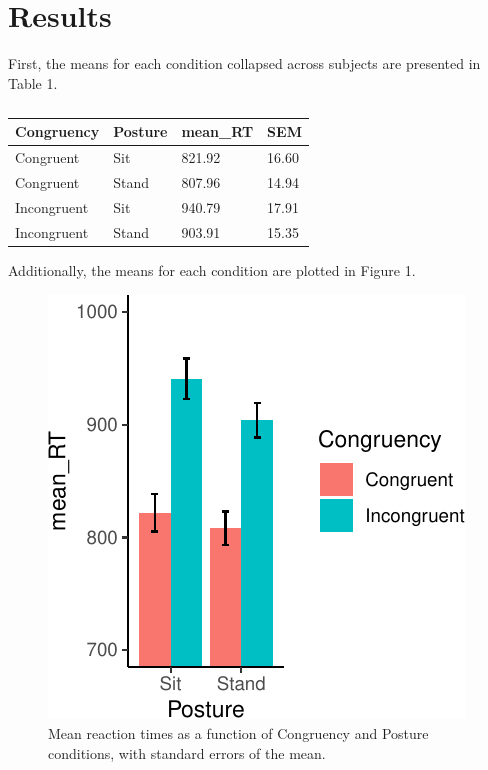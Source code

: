 \documentclass[
  man]{apa6}
\begin{document}
\hypertarget{results}{%
\section{Results}\label{results}}

First, the means for each condition collapsed across subjects are presented in Table 1.

\begin{table}[tbp]

\begin{center}
\begin{threeparttable}

\caption{\label{tab:unnamed-chunk-1}}

\begin{tabular}{llll}
\toprule
Congruency & \multicolumn{1}{c}{Posture} & \multicolumn{1}{c}{mean\_RT} & \multicolumn{1}{c}{SEM}\\
\midrule
Congruent & Sit & 821.92 & 16.60\\
Congruent & Stand & 807.96 & 14.94\\
Incongruent & Sit & 940.79 & 17.91\\
Incongruent & Stand & 903.91 & 15.35\\
\bottomrule
\end{tabular}

\end{threeparttable}
\end{center}

\end{table}

Additionally, the means for each condition are plotted in Figure 1.

\begin{figure}
\centering
\includegraphics{SemesterProject_files/figure-latex/unnamed-chunk-2-1.pdf}
\caption{\label{fig:unnamed-chunk-2}Mean reaction times as a function of Congruency and Posture conditions, with standard errors of the mean.}
\end{figure}
\end{document}
